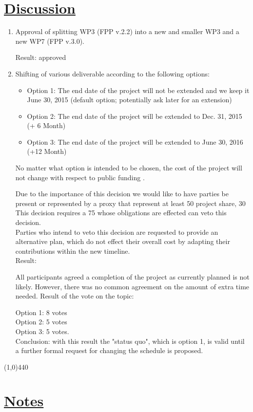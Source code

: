 \documentclass[a4paper]{article}
\begin{document}
\section*{\underline{Discussion}}
\begin{enumerate}
\item Approval of splitting WP3 (FPP v.2.2) into a new and smaller WP3 and a
new WP7 (FPP v.3.0).

Result: approved

\item Shifting of various deliverable according to the following options:
\begin{itemize}

\item Option 1:  The end date of the project will not be extended and we keep
it June 30, 2015 (default option; potentially ask later for an extension)
\item Option 2:  The end date of the project will be extended to Dec. 31,
2015 (+ 6 Month)
\item Option 3:  The end date of the project will be extended to June 30,
2016 (+12 Month)
\end{itemize}

No matter what option is intended to be chosen, the cost of the project
will not change with respect to public funding .

Due to the importance of this decision we would like to have parties be
present or represented by a proxy that represent at least 50%
project share, 30%
This decision requires a 75%
whose obligations are effected can veto this decision.\\

Parties who intend to veto this decision are requested to provide an
alternative plan, which do not effect their overall cost by adapting their
contributions within the new timeline.\\

Result:

All participants agreed a completion of the project as currently planned
is not likely.
However, there was no common agreement on the amount of extra time needed.
Result of the vote on the topic:

Option 1: 8 votes\\
Option 2: 5 votes\\
Option 3: 5 votes.\\

Conclusion: with this result the "status quo", which is option 1, is valid
until a further formal request for changing the schedule is proposed.
\end{enumerate}
\line(1,0){440}
\section*{\underline{Notes}}
\end{document}
